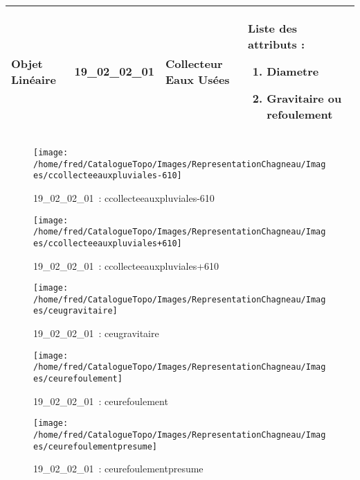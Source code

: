 \documentclass[12pt,titlepage]{book}
\begin{document}
\renewcommand{\arraystretch}{1.2}
\begin{supertabular}{|p{10cm}|c|p{13cm}|p{12cm}|}
 Objet Linéaire & 19\_02\_02\_01 & Collecteur Eaux Usées & Liste des attributs :
\begin{enumerate}
  \item Diametre  \item Gravitaire ou refoulement\end{enumerate}
\\
\hline
\end{supertabular}
\begin{figure}[h!]
  \hfill         %
  \begin{minipage}[t]{3cm}
    \begin{center}
      \texttt{[image: /home/fred/CatalogueTopo/Images/RepresentationChagneau/Images/ccollecteeauxpluviales-610]}
      \caption[~19\_02\_02\_01]{\small{19\_02\_02\_01~:} \tiny{ccollecteeauxpluviales-610}}\label{ccollecteeauxpluviales-610}
    \end{center}
  \end{minipage}
  \begin{minipage}[t]{3cm}
    \begin{center}
      \texttt{[image: /home/fred/CatalogueTopo/Images/RepresentationChagneau/Images/ccollecteeauxpluviales+610]}
      \caption[~19\_02\_02\_01]{\small{19\_02\_02\_01~:} \tiny{ccollecteeauxpluviales+610}}\label{ccollecteeauxpluviales+610}
    \end{center}
  \end{minipage}
  \begin{minipage}[t]{3cm}
    \begin{center}
      \texttt{[image: /home/fred/CatalogueTopo/Images/RepresentationChagneau/Images/ceugravitaire]}
      \caption[~19\_02\_02\_01]{\small{19\_02\_02\_01~:} \tiny{ceugravitaire}}\label{ceugravitaire}
    \end{center}
  \end{minipage}
  \begin{minipage}[t]{3cm}
    \begin{center}
      \texttt{[image: /home/fred/CatalogueTopo/Images/RepresentationChagneau/Images/ceurefoulement]}
      \caption[~19\_02\_02\_01]{\small{19\_02\_02\_01~:} \tiny{ceurefoulement}}\label{ceurefoulement}
    \end{center}
  \end{minipage}
  \begin{minipage}[t]{3cm}
    \begin{center}
      \texttt{[image: /home/fred/CatalogueTopo/Images/RepresentationChagneau/Images/ceurefoulementpresume]}
      \caption[~19\_02\_02\_01]{\small{19\_02\_02\_01~:} \tiny{ceurefoulementpresume}}\label{ceurefoulementpresume}
    \end{center}
  \end{minipage}
\end{figure}
\end{document}
